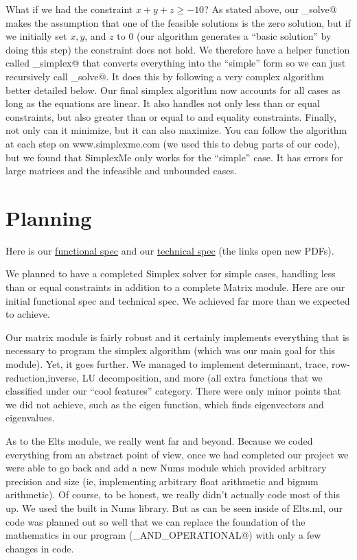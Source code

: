 \documentclass[letterpaper,12pt]{article}
\begin{document}
What if we had the constraint $x + y + z \geq -10$? As stated above, our
\verb@simple_solve@ makes the assumption that one of the feasible solutions is
the zero solution, but if we initially set $x, y$, and $z$ to 0 (our algorithm
generates a ``basic solution'' by doing this step) the constraint does not hold.
We therefore have a helper function called \verb@initialize_simplex@ that
converts everything into the ``simple'' form so we can just recursively call
\verb@simple_solve@. It does this by following a very complex algorithm better
detailed below. Our final  simplex algorithm now accounts for all cases as long
as the equations are linear. It also handles not only less than or equal
constraints, but also greater than or equal to and equality constraints.
Finally, not only can it minimize, but it can also maximize. You can follow the
algorithm at each step on www.simplexme.com (we used this to debug parts of our
code), but we found that SimplexMe only works for the ``simple'' case. It has
errors for large matrices and the infeasible and unbounded cases. 
	
\section{Planning}
Here is our \href{./DraftSpec_Annotated.pdf}{functional spec} and our
\href{./FinalSpec_Annotated.pdf}{technical spec} (the links open new PDFs). 

We planned to have a completed Simplex solver for simple cases, handling less
than or equal constraints in addition to a complete Matrix module. Here are our
initial functional spec and technical spec. We achieved far more than we
expected to achieve. 

Our matrix module is fairly robust and it certainly implements everything that
is necessary to program the simplex algorithm (which was our main goal for this
module). Yet, it goes further. We managed to implement determinant, trace,
row-reduction,inverse, LU decomposition, and more (all extra functions that we
classified under our ``cool features'' category. There were only minor points
that we did not achieve, such as the eigen function, which finds eigenvectors
and eigenvalues.

As to the Elts module, we really went far and beyond. Because we coded
everything from an abstract point of view, once we had completed our project we
were able to go back and add a new Nums module which provided arbitrary
precision and size (ie, implementing arbitrary float arithmetic and bignum
arithmetic). Of course, to be honest, we really didn't actually code most of
this up. We used the built in Nums library. But as can be seen inside of
Elts.ml, our code was planned out so well that we can replace the foundation of
the mathematics in our program (\verb@ORDERED_AND_OPERATIONAL@) with only a few
changes in code.
\end{document}

